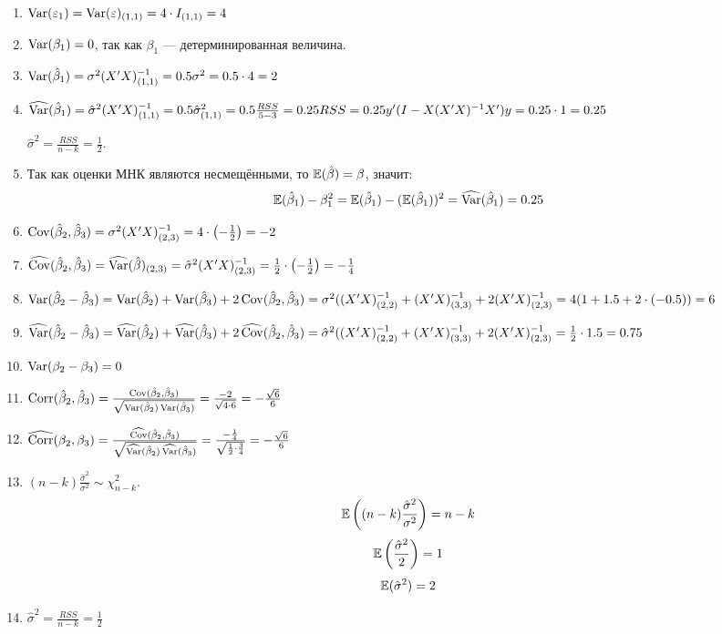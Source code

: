 \begin{problem}
\begin{sol}
\begin{enumerate}
\item $\Var(\e_1)=\Var(\e)_{(1,1)}=4\cdot I_{(1,1)}=4$
\item $\Var(\beta_1)=0$, так как $\beta_1$ — детерминированная величина.
\item $\Var(\hb_1)=\sigma^2(X'X)^{-1}_{(1,1)}=0.5\sigma^2=0.5\cdot 4=2$
\item $\hVar(\hb_1)=\hat\sigma^2(X'X)^{-1}_{(1,1)}=0.5\hat\sigma^2_{(1,1)}=0.5\frac{RSS}{5-3}=0.25RSS=0.25y'(I-X(X'X)^{-1}X')y=0.25\cdot 1=0.25$

$\hat\sigma^2=\frac{RSS}{n-k}=\frac12$.

\item Так как оценки МНК являются несмещёнными, то $\E(\hb)=\beta$, значит:
\[
\E(\hb_1)-\beta_1^2=\E(\hb_1)-(\E(\hb_1))^2=\hVar(\hb_1)=0.25
\]

\item $\Cov(\hb_2,\hb_3)=\sigma^2(X'X)^{-1}_{(2,3)}=4\cdot\left(-\frac12\right)=-2$
\item $\hCov(\hb_2,\hb_3)=\hVar(\hat\beta)_{(2,3)}=\hat\sigma^2(X'X)^{-1}_{(2,3)}=\frac{1}{2}\cdot\left(-\frac12\right)=-\frac14$

\item $\Var(\hb_2-\hb_3)=\Var(\hb_2)+\Var(\hb_3)+2\Cov(\hb_2,\hb_3)=\sigma^2((X'X)^{-1}_{(2,2)}+(X'X)^{-1}_{(3,3)}+2(X'X)^{-1}_{(2,3)}=4(1+1.5+2\cdot(-0.5))=6$

\item $\hVar(\hb_2-\hb_3)=\hVar(\hb_2)+\hVar(\hb_3)+2\hCov(\hb_2,\hb_3)=\hat\sigma^2((X'X)^{-1}_{(2,2)}+(X'X)^{-1}_{(3,3)}+2(X'X)^{-1}_{(2,3)}=\frac{1}{2}\cdot1.5=0.75$

\item $\Var(\beta_2-\beta_3)=0$

\item $\Corr(\hb_2,\hb_3)=\frac{\Cov(\hb_2,\hb_3)}{\sqrt{\Var(\hb_2)\Var(\hb_3)}}=\frac{-2}{\sqrt{4\cdot6}}=-\frac{\sqrt6}{6}$

\item $\hCorr(\beta_2,\beta_3)=\frac{\hCov(\hb_2,\hb_3)}{\sqrt{\hVar(\hb_2)\hVar(\hb_3)}}=\frac{-\frac14}{\sqrt{\frac12\cdot\frac34}}=-\frac{\sqrt6}{6}$

\item $(n-k)\frac{\hat\sigma^2}{\sigma^2}\sim\chi^2_{n-k}$.
\[
\E\left((n-k)\frac{\hat\sigma^2}{\sigma^2}\right)=n-k
\]
\[
\E\left(\frac{\hat\sigma^2}{2}\right)=1
\]
\[
\E(\hat\sigma^2)=2
\]

\item $\hat\sigma^2=\frac{RSS}{n-k}=\frac12$

\end{enumerate}

\end{sol}
\end{problem}





